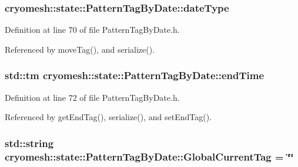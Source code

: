 \hypertarget{classcryomesh_1_1state_1_1PatternTagByDate_a978cee17d8215fcf90a050a033cab7ec}{
\subsubsection[{date\-Type}]{ {\bf cryomesh\-::state\-::\-Pattern\-Tag\-By\-Date\-::date\-Type}}}\label{classcryomesh_1_1state_1_1PatternTagByDate_a978cee17d8215fcf90a050a033cab7ec}


\-Definition at line 70 of file \-Pattern\-Tag\-By\-Date.\-h.



\-Referenced by move\-Tag(), and serialize().

\hypertarget{classcryomesh_1_1state_1_1PatternTagByDate_a7d1640030846523333a228078cd72acc}{
\subsubsection[{end\-Time}]{\setlength{\rightskip}{0pt plus 5cm}std\-::tm {\bf cryomesh\-::state\-::\-Pattern\-Tag\-By\-Date\-::end\-Time}}}\label{classcryomesh_1_1state_1_1PatternTagByDate_a7d1640030846523333a228078cd72acc}


\-Definition at line 72 of file \-Pattern\-Tag\-By\-Date.\-h.



\-Referenced by get\-End\-Tag(), serialize(), and set\-End\-Tag().

\hypertarget{classcryomesh_1_1state_1_1PatternTagByDate_a9fd6ba74e86f3f438e9853bd342a0842}{
\subsubsection[{\-Global\-Current\-Tag}]{\setlength{\rightskip}{0pt plus 5cm}std\-::string {\bf cryomesh\-::state\-::\-Pattern\-Tag\-By\-Date\-::\-Global\-Current\-Tag} = \char`\"{}\char`\"{}}}\label{classcryomesh_1_1state_1_1PatternTagByDate_a9fd6ba74e86f3f438e9853bd342a0842}


